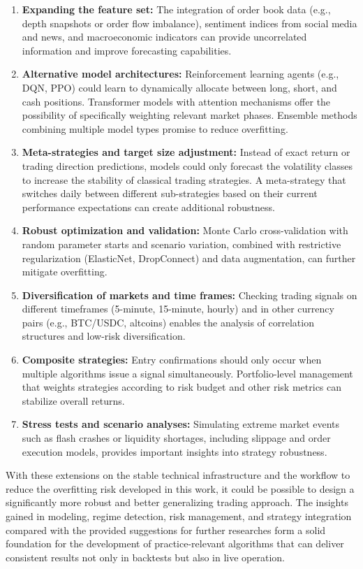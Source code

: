 \begin{enumerate}
    \item \textbf{Expanding the feature set:} The integration of order book data (e.g., depth snapshots or order flow imbalance), sentiment indices from social media and news, and macroeconomic indicators can provide uncorrelated information and improve forecasting capabilities.
    \item \textbf{Alternative model architectures:} Reinforcement learning agents (e.g., DQN, PPO) could learn to dynamically allocate between long, short, and cash positions. Transformer models with attention mechanisms offer the possibility of specifically weighting relevant market phases. Ensemble methods combining multiple model types promise to reduce overfitting.
    \item \textbf{Meta-strategies and target size adjustment:} Instead of exact return or trading direction predictions, models could only forecast the volatility classes to increase the stability of classical trading strategies. A meta-strategy that switches daily between different sub-strategies based on their current performance expectations can create additional robustness.
    \item \textbf{Robust optimization and validation:} Monte Carlo cross-validation with random parameter starts and scenario variation, combined with restrictive regularization (ElasticNet, DropConnect) and data augmentation, can further mitigate overfitting.
    \item \textbf{Diversification of markets and time frames:} Checking trading signals on different timeframes (5-minute, 15-minute, hourly) and in other currency pairs (e.g., BTC/USDC, altcoins) enables the analysis of correlation structures and low-risk diversification.
    \item \textbf{Composite strategies:} Entry confirmations should only occur when multiple algorithms issue a signal simultaneously. Portfolio-level management that weights strategies according to risk budget and other risk metrics can stabilize overall returns.
    \item \textbf{Stress tests and scenario analyses:} Simulating extreme market events such as flash crashes or liquidity shortages, including slippage and order execution models, provides important insights into strategy robustness.
\end{enumerate}

\noindent
With these extensions on the stable technical infrastructure and the workflow to reduce the overfitting risk developed in this work, it could be possible to design a significantly more robust and better generalizing trading approach.
The insights gained in modeling, regime detection, risk management, and strategy integration compared with the provided suggestions for further researches form a solid foundation for the development of practice-relevant algorithms that can deliver consistent results not only in backtests but also in live operation.

